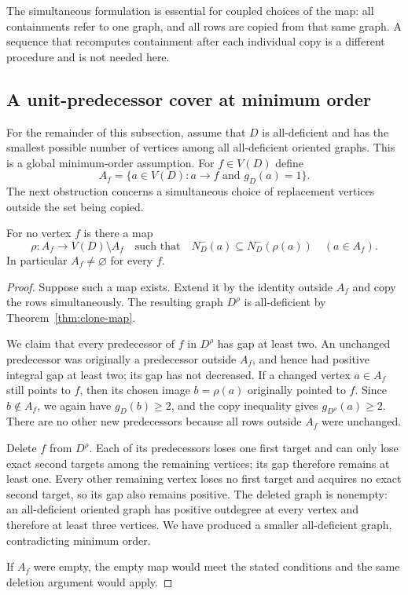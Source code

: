The simultaneous formulation is essential for coupled choices of the
map: all containments refer to one graph, and all rows are copied from
that same graph. A sequence that recomputes containment after each
individual copy is a different procedure and is not needed here.

\subsection{A unit-predecessor cover at minimum order}

For the remainder of this subsection, assume that $D$ is all-deficient
and has the smallest possible number of vertices among all
all-deficient oriented graphs. This is a global minimum-order
assumption. For $f\in V(D)$ define
\[
 A_f=\{a\in V(D):a\to f\text{ and }g_D(a)=1\}.
\]
The next obstruction concerns a simultaneous choice of replacement
vertices outside the set being copied.

\begin{lemma}
\label{lem:paper-unit-predecessor-obstruction}
For no vertex $f$ is there a map
\[
 \rho:A_f\longrightarrow V(D)\setminus A_f
 \quad\text{such that}\quad
 N_D^-(a)\subseteq N_D^-(\rho(a))\quad(a\in A_f).
\]
In particular $A_f\ne\varnothing$ for every $f$.
\end{lemma}
\begin{proof}
Suppose such a map exists. Extend it by the identity outside $A_f$
and copy the rows simultaneously. The resulting graph $D^\rho$ is
all-deficient by Theorem~\ref{thm:clone-map}.

We claim that every predecessor of $f$ in $D^\rho$ has gap at least
two. An unchanged predecessor was originally a predecessor outside
$A_f$, and hence had positive integral gap at least two; its gap has
not decreased. If a changed vertex $a\in A_f$ still points to $f$,
then its chosen image $b=\rho(a)$ originally pointed to $f$.
Since $b\notin A_f$, we again have $g_D(b)\geq2$, and the copy
inequality gives $g_{D^\rho}(a)\geq2$. There are no other new
predecessors because all rows outside $A_f$ were unchanged.

Delete $f$ from $D^\rho$. Each of its predecessors loses one first
target and can only lose exact second targets among the remaining
vertices; its gap therefore remains at least one. Every other
remaining vertex loses no first target and acquires no exact second
target, so its gap also remains positive. The deleted graph is
nonempty: an all-deficient oriented graph has positive outdegree at
every vertex and therefore at least three vertices. We have produced
a smaller all-deficient graph, contradicting minimum order.

If $A_f$ were empty, the empty map would meet the stated conditions
and the same deletion argument would apply.
\end{proof}


